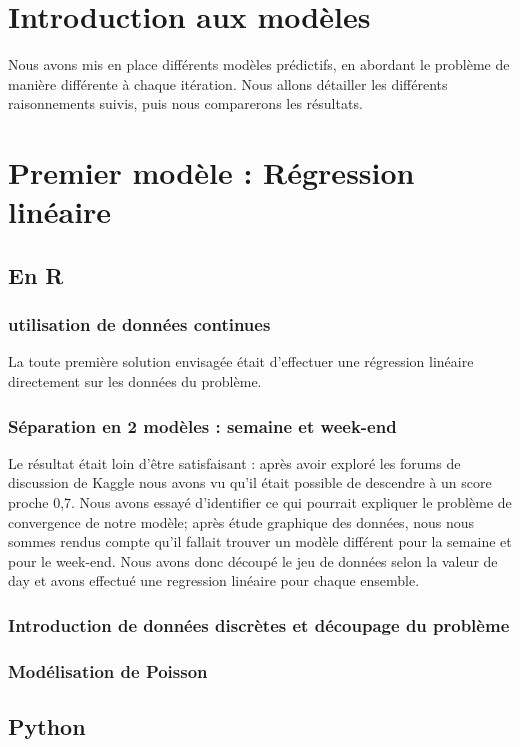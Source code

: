 \section{Introduction aux modèles}

Nous avons mis en place différents modèles prédictifs, en abordant le problème de manière différente à chaque itération. Nous allons détailler les différents raisonnements suivis, puis nous comparerons les résultats.

\section{Premier modèle : Régression linéaire}

\subsection{En R}

\subsubsection{utilisation de données continues}

La toute première solution envisagée était d'effectuer une régression linéaire directement sur les données du problème.

\subsubsection{Séparation en 2 modèles : semaine et week-end}

Le résultat était loin d'être satisfaisant : après avoir exploré les forums de discussion de Kaggle nous avons vu qu'il était possible de descendre à un score proche 0,7. Nous avons essayé d'identifier ce qui pourrait expliquer le problème de convergence de notre modèle; après étude graphique des données, nous nous sommes rendus compte qu'il fallait trouver un modèle différent pour la semaine et pour le week-end. Nous avons donc découpé le jeu de données selon la valeur de day et avons effectué une regression linéaire pour chaque ensemble.

\subsubsection{Introduction de données discrètes et découpage du problème}

\subsubsection{Modélisation de Poisson}

\subsection{Python}



